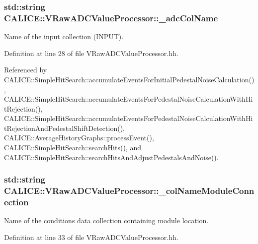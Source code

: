 \subsubsection[{\-\_\-adc\-Col\-Name}]{\setlength{\rightskip}{0pt plus 5cm}std\-::string C\-A\-L\-I\-C\-E\-::\-V\-Raw\-A\-D\-C\-Value\-Processor\-::\-\_\-adc\-Col\-Name\hspace{0.3cm}{\ttfamily [protected]}}\label{classCALICE_1_1VRawADCValueProcessor_a9af055c07a4e40284ba7851ee901d7af}


Name of the input collection (I\-N\-P\-U\-T). 



Definition at line 28 of file V\-Raw\-A\-D\-C\-Value\-Processor.\-hh.



Referenced by C\-A\-L\-I\-C\-E\-::\-Simple\-Hit\-Search\-::accumulate\-Events\-For\-Initial\-Pedestal\-Noise\-Calculation(), C\-A\-L\-I\-C\-E\-::\-Simple\-Hit\-Search\-::accumulate\-Events\-For\-Pedestal\-Noise\-Calculation\-With\-Hit\-Rejection(), C\-A\-L\-I\-C\-E\-::\-Simple\-Hit\-Search\-::accumulate\-Events\-For\-Pedestal\-Noise\-Calculation\-With\-Hit\-Rejection\-And\-Pedestal\-Shift\-Detection(), C\-A\-L\-I\-C\-E\-::\-Average\-History\-Graphs\-::process\-Event(), C\-A\-L\-I\-C\-E\-::\-Simple\-Hit\-Search\-::search\-Hits(), and C\-A\-L\-I\-C\-E\-::\-Simple\-Hit\-Search\-::search\-Hits\-And\-Adjust\-Pedestals\-And\-Noise().

\subsubsection[{\-\_\-col\-Name\-Module\-Connection}]{\setlength{\rightskip}{0pt plus 5cm}std\-::string C\-A\-L\-I\-C\-E\-::\-V\-Raw\-A\-D\-C\-Value\-Processor\-::\-\_\-col\-Name\-Module\-Connection\hspace{0.3cm}{\ttfamily [protected]}}\label{classCALICE_1_1VRawADCValueProcessor_a186586ecdee3ab773bdd40ad3e8594dc}


Name of the conditions data collection containing module location. 



Definition at line 33 of file V\-Raw\-A\-D\-C\-Value\-Processor.\-hh.

